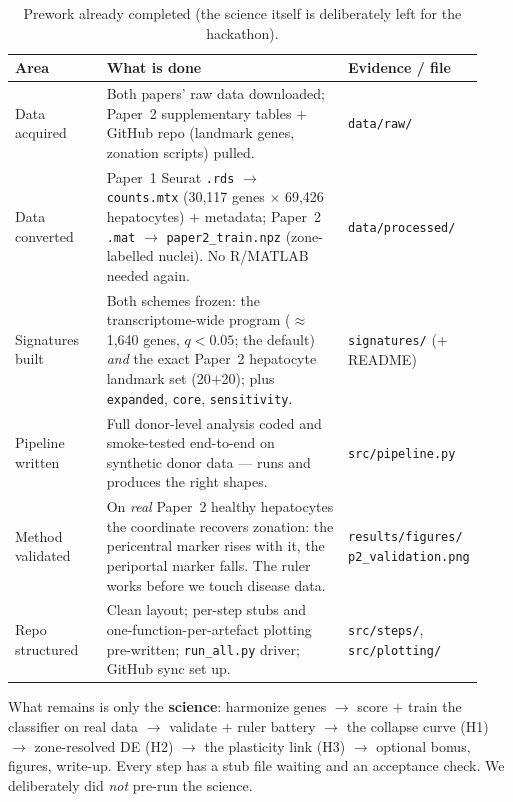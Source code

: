 \documentclass[11pt]{article}
\newcommand{\code}[1]{\texttt{#1}}
\begin{document}
\begin{table}[h]
\centering\small
\caption{Prework already completed (the science itself is deliberately left for the hackathon).}
\label{tab:prework}
\begin{tabular}{@{}p{0.20\linewidth} p{0.55\linewidth} p{0.18\linewidth}@{}}
\toprule
\textbf{Area} & \textbf{What is done} & \textbf{Evidence / file}\\
\midrule
Data acquired & Both papers' raw data downloaded; Paper~2 supplementary tables + GitHub repo
(landmark genes, zonation scripts) pulled. & \code{data/raw/}\\
Data converted & Paper~1 Seurat \code{.rds} $\to$ \code{counts.mtx} (30{,}117 genes $\times$ 69{,}426
hepatocytes) + metadata; Paper~2 \code{.mat} $\to$ \code{paper2\_train.npz} (zone-labelled nuclei). No
R/MATLAB needed again. & \code{data/processed/}\\
Signatures built & Both schemes frozen: the transcriptome-wide program ($\approx$1{,}640 genes,
$q<0.05$; the default) \emph{and} the exact Paper~2 hepatocyte landmark set (20$+$20); plus \code{expanded}, \code{core},
\code{sensitivity}. & \code{signatures/} (+ README)\\
Pipeline written & Full donor-level analysis coded and smoke-tested end-to-end on synthetic donor data
--- runs and produces the right shapes. & \code{src/pipeline.py}\\
Method validated & On \emph{real} Paper~2 healthy hepatocytes the coordinate recovers zonation: the
pericentral marker rises with it, the periportal marker falls. The ruler works before we touch disease
data. & \code{results/figures/} \code{p2\_validation.png}\\
Repo structured & Clean layout; per-step stubs and one-function-per-artefact plotting pre-written;
\code{run\_all.py} driver; GitHub sync set up. & \code{src/steps/}, \code{src/plotting/}\\
\bottomrule
\end{tabular}
\end{table}

What remains is only the \textbf{science}: harmonize genes $\to$ score $+$ train the classifier on
real data $\to$ validate $+$ ruler battery $\to$ the collapse curve (H1) $\to$ zone-resolved DE (H2)
$\to$ the plasticity link (H3) $\to$ optional bonus, figures, write-up. Every step has a stub file
waiting and an acceptance check. We deliberately did \emph{not} pre-run the science.

\clearpage
\end{document}
